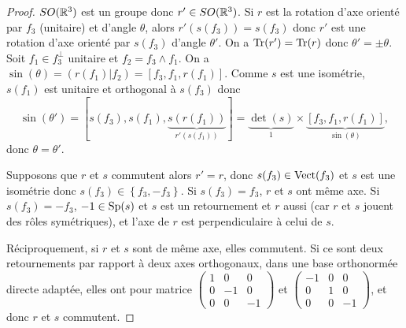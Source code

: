 \documentclass[12pt]{article}
\begin{document}
\begin{proof}
	$SO(\mathbb{R}^{3})$ est un groupe donc $r'\in SO(\mathbb{R}^{3})$. Si $r$ est la rotation d'axe orienté par $f_{3}$ (unitaire) et d'angle $\theta$, alors $r'(s(f_{3}))=s(f_{3})$ donc $r'$ est une rotation d'axe orienté par $s(f_{3})$ d'angle $\theta'$. On a $\operatorname{Tr}(r')=\operatorname{Tr}(r)$ donc $\theta'=\pm\theta$. Soit $f_{1}\in f_{3}^{\perp}$ unitaire et $f_{2}=f_{3}\wedge f_{1}$. On a $\sin(\theta)=(r(f_{1})|f_2)=[f_3,f_1,r(f_1)]$. Comme $s$ est une isométrie, $s(f_1)$ est unitaire et orthogonal à $s(f_3)$ donc 
	\begin{equation}
		\sin(\theta')=[s(f_3),s(f_1),\underbrace{s(r(f_1))}_{r'(s(f_1))}]=\underbrace{\det(s)}_{1}\times\underbrace{[f_3,f_1,r(f_1)]}_{\sin(\theta)},
	\end{equation}
	donc $\theta=\theta'$.

	Supposons que $r$ et $s$ commutent alors $r'=r$, donc $s(f_{3})\in\operatorname{Vect}(f_{3})$ et $s$ est une isométrie donc $s(f_{3})\in\left\lbrace f_3,-f_3\right\rbrace$. Si $s(f_3)=f_3$, $r$ et $s$ ont même axe. Si $s(f_3)=-f_3$, $-1\in\operatorname{Sp}(s)$ et $s$ est un retournement et $r$ aussi (car $r$ et $s$ jouent des rôles symétriques), et l'axe de $r$ est perpendiculaire à celui de $s$.

	Réciproquement, si $r$ et $s$ sont de même axe, elles commutent. Si ce sont deux retournements par rapport à deux axes orthogonaux, dans une base orthonormée directe adaptée, elles ont pour matrice $\begin{pmatrix}
		1&0&0\\0&-1&0\\0&0&-1
	\end{pmatrix}$ et $\begin{pmatrix}
		-1&0&0\\0&1&0\\0&0&-1
	\end{pmatrix}$, et donc $r$ et $s$ commutent.
\end{proof}
\end{document}
